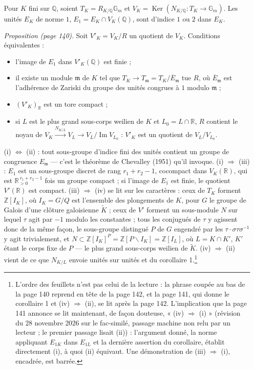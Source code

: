 \documentclass[11pt,a4paper]{article}
\begin{document}
Pour $K$ fini sur $\mathbb{Q}$, soient $T_{K} = R_{K/\mathbb{Q}}\mathbb{G}_{m}$ et
$V_{K} = \operatorname{Ker}(N_{K/\mathbb{Q}} \colon T_{K} \to \mathbb{G}_{m})$.
Les unités $E_{K}$ de norme $1$, $E_{1} = E_{K} \cap V_{K}(\mathbb{Q})$, sont
d'indice $1$ ou $2$ dans $E_{K}$.

\emph{Proposition (page 140).} Soit $V'_{K} = V_{K}/R$ un quotient de $V_{K}$.
Conditions équivalentes :
\begin{itemize}
  \item[(i)] l'image de $E_{1}$ dans $V'_{K}(\mathbb{Q})$ est finie ;
  \item[(ii)] il existe un module $\mathfrak{m}$ de $K$ tel que $T_{K} \to
  T_{\mathfrak{m}} = T_{K}/\overline{E}_{\mathfrak{m}}$ tue $R$, où
  $\overline{E}_{\mathfrak{m}}$ est l'adhérence de Zariski du groupe des unités
  congrues à $1$ modulo $\mathfrak{m}$ ;
  \item[(iii)] $(V'_{K})_{\mathbb{R}}$ est un tore compact ;
  \item[(iv)] si $L$ est le plus grand sous-corps weilien de $K$ et $L_{0} = L
  \cap \mathbb{R}$, $R$ contient le noyau de $V_{K} \xrightarrow{N_{K/L}} V_{L}
  \to V_{L}/\operatorname{Im} V_{L_{0}}$ : $V'_{K}$ est un quotient de
  $V_{L}/V_{L_{0}}$.
\end{itemize}

(i) $\Leftrightarrow$ (ii) : tout sous-groupe d'indice fini des unités contient
un groupe de congruence $E_{\mathfrak{m}}$ --- c'est le théorème de Chevalley
(1951) qu'il invoque. (i) $\Rightarrow$ (iii) : $E_{1}$ est un sous-groupe
discret de rang $r_{1} + r_{2} - 1$, cocompact dans $V_{K}(\mathbb{R})$, qui est
$\mathbb{R}_{>0}^{\,r_{1} + r_{2} - 1}$ fois un groupe compact ; si l'image de
$E_{1}$ est finie, le quotient $V'(\mathbb{R})$ est compact. (iii) $\Rightarrow$
(iv) se lit sur les caractères : ceux de $T_{K}$ forment
$\mathbb{Z}[I_{K}]$, où $I_{K} = G/Q$ est l'ensemble des plongements de $K$, pour
$G$ le groupe de Galois d'une clôture galoisienne $\widetilde{K}$ ; ceux de $V'$
forment un sous-module $N$ sur lequel $\tau$ agit par $-1$ modulo les constantes ;
tous les conjugués de $\tau$ y agissent donc de la même façon, le sous-groupe
distingué $P$ de $G$ engendré par les $\tau \cdot \sigma\tau\sigma^{-1}$ y agit
trivialement, et $N \subset \mathbb{Z}[I_{K}]^{P} = \mathbb{Z}[P\backslash I_{K}]
= \mathbb{Z}[I_{L}]$, où $L = K \cap K'$, $K'$ étant le corps fixe de $P$ --- le
plus grand sous-corps weilien de $\widetilde{K}$. (iv) $\Rightarrow$ (ii) vient de ce que $N_{K/L}$
envoie unités sur unités et du corollaire 1.\footnote{L'ordre des feuillets
n'est pas celui de la lecture : la phrase coupée au bas de la page 140 reprend
en tête de la page 142, et la page 141, qui donne le corollaire 1 et (iv)
$\Rightarrow$ (ii), se lit après la page 142. L'implication que la page 141
annonce se lit maintenant, de façon douteuse, « (iv) $\Longrightarrow$ (i) »
(révision du 28 novembre 2026 sur le fac-similé, passage machine non relu par un lecteur ; le premier passage lisait (ii)) : l'argument donné, la norme appliquant
$E_{1K}$ dans $E_{1L}$ et la dernière assertion du corollaire, établit
directement (i), à quoi (ii) équivaut. Une démonstration de (iii)
$\Rightarrow$ (i), encadrée, est barrée.}
\end{document}
